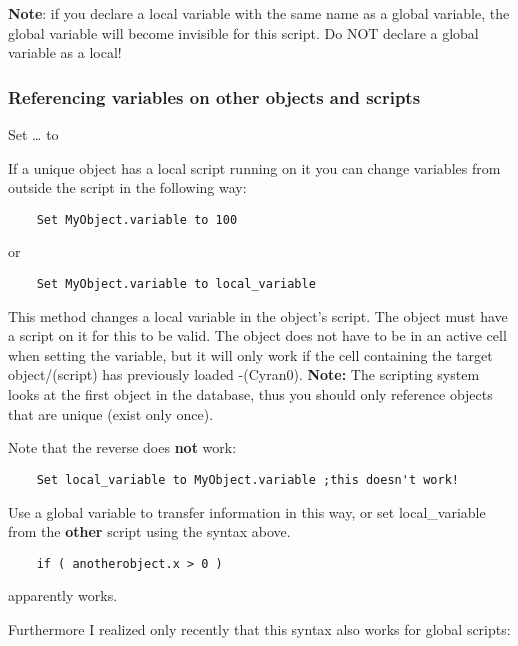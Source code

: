 \textbf{Note}: if you declare a local variable with the same name as a
global variable, the global variable will become invisible for this
script. Do NOT declare a global variable as a local!

\hypertarget{referencing-variables-on-other-objects-and-scripts}{%
\subsubsection{Referencing variables on other objects and
scripts}\label{referencing-variables-on-other-objects-and-scripts}}

Set \ldots{} to

If a unique object has a local script running on it you can change
variables from outside the script in the following way:

\begin{lstlisting}
	Set MyObject.variable to 100
\end{lstlisting}

or

\begin{lstlisting}
	Set MyObject.variable to local_variable
\end{lstlisting}

This method changes a local variable in the object's script. The object
must have a script on it for this to be valid. The object does not have
to be in an active cell when setting the variable, but it will only work
if the cell containing the target object/(script) has previously loaded
-(Cyran0). \textbf{Note:} The scripting system looks at the first object
in the database, thus you should only reference objects that are unique
(exist only once).

Note that the reverse does \textbf{not} work:

\begin{lstlisting}
	Set local_variable to MyObject.variable ;this doesn't work!
\end{lstlisting}

Use a global variable to transfer information in this way, or set
local\_variable from the \textbf{other} script using the syntax above.

\begin{lstlisting}
	if ( anotherobject.x > 0 )
\end{lstlisting}

apparently works.

Furthermore I realized only recently that this syntax also works for
global scripts:\\
\strut \\

